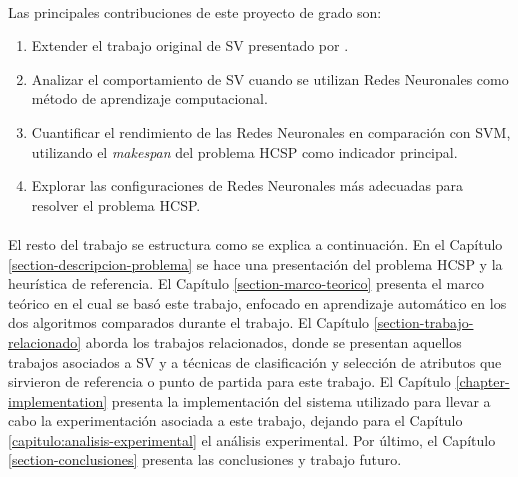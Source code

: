 \paragraph{}Las principales contribuciones de este proyecto de grado son:
\begin{enumerate}
    \item Extender el trabajo original de SV presentado por \citet{savant-original}.
    \item Analizar el comportamiento de SV cuando se utilizan Redes Neuronales como método de aprendizaje computacional.
    \item Cuantificar el rendimiento de las Redes Neuronales en comparación con SVM, utilizando el \textit{makespan} del problema HCSP como indicador principal.
    \item Explorar las configuraciones de Redes Neuronales más adecuadas para resolver el problema HCSP.
\end{enumerate}

\paragraph{} El resto del trabajo se estructura como se explica a continuación.
En el Capítulo \ref{section-descripcion-problema} se hace una presentación del problema HCSP y la heurística de referencia. El Capítulo \ref{section-marco-teorico} presenta el marco teórico en el cual se basó este trabajo, enfocado en aprendizaje automático en los dos algoritmos comparados durante el trabajo.
El Capítulo \ref{section-trabajo-relacionado} aborda los trabajos relacionados, donde se presentan aquellos trabajos asociados a SV y a técnicas de clasificación y selección de atributos que sirvieron de referencia o punto de partida para este trabajo.
El Capítulo \ref{chapter-implementation} presenta la implementación del sistema utilizado para llevar a cabo la experimentación asociada a este trabajo, dejando para el Capítulo \ref{capitulo:analisis-experimental} el análisis experimental.
Por último, el Capítulo \ref{section-conclusiones} presenta las conclusiones y trabajo futuro.
